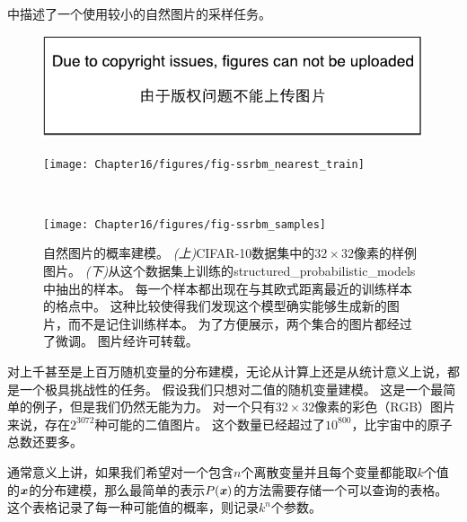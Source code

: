 中描述了一个使用较小的自然图片的采样任务。

\begin{figure}[!htb]
\ifOpenSource
\centerline{\includegraphics{figure.pdf}}
\else
	\centerline{\texttt{[image: Chapter16/figures/fig-ssrbm\_nearest\_train]}}\ \\
     \centerline{\texttt{[image: Chapter16/figures/fig-ssrbm\_samples]}}
\fi
	\caption{自然图片的概率建模。
\emph{(上)}CIFAR-10数据集\citep{KrizhevskyHinton2009}中的$32\times 32$像素的样例图片。
\emph{(下)}从这个数据集上训练的\gls{structured_probabilistic_models}中抽出的样本。
每一个样本都出现在与其欧式距离最近的训练样本的格点中。
这种比较使得我们发现这个模型确实能够生成新的图片，而不是记住训练样本。
为了方便展示，两个集合的图片都经过了微调。
图片经\citet{Courville+al-2011-small}许可转载。}
	\label{fig:chap16_fig-ssrbm}
\end{figure}

对上千甚至是上百万随机变量的分布建模，无论从计算上还是从统计意义上说，都是一个极具挑战性的任务。
假设我们只想对二值的随机变量建模。
这是一个最简单的例子，但是我们仍然无能为力。
对一个只有$32\times 32$像素的彩色（RGB）图片来说，存在$2^{3072}$种可能的二值图片。
这个数量已经超过了$10^{800}$，比宇宙中的原子总数还要多。

通常意义上讲，如果我们希望对一个包含$n$个离散变量并且每个变量都能取$k$个值的$\boldsymbol{\mathit{x}}$的分布建模，那么最简单的表示$P(\boldsymbol{\mathit{x}})$的方法需要存储一个可以查询的表格。
这个表格记录了每一种可能值的概率，则记录$k^n$个参数。

